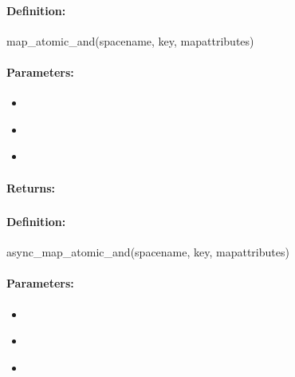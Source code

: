 \paragraph{Definition:}
\begin{rubycode}
map_atomic_and(spacename, key, mapattributes)
\end{rubycode}

\paragraph{Parameters:}
\begin{itemize}[noitemsep]
\item {}\\

\item {}\\

\item {}\\

\end{itemize}

\paragraph{Returns:}


\pagebreak
\subsubsection{}
\label{api:ruby:async_map_atomic_and}


\paragraph{Definition:}
\begin{rubycode}
async_map_atomic_and(spacename, key, mapattributes)
\end{rubycode}

\paragraph{Parameters:}
\begin{itemize}[noitemsep]
\item {}\\

\item {}\\

\item {}\\

\end{itemize}

